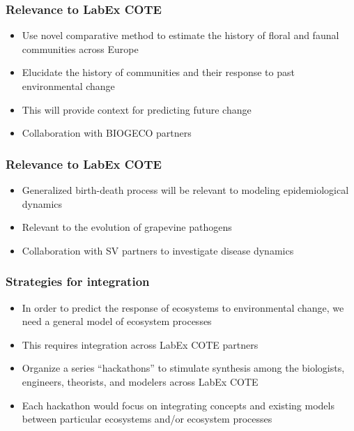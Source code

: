 \begin{frame}
    \frametitle{Relevance to LabEx COTE}
    \begin{itemize}
        \item<2-> Use novel comparative method to estimate the history of floral
            and faunal communities across Europe
        \item<3-> Elucidate the history of communities and their response to past
            environmental change
        \item<4-> This will provide context for predicting future change
        \item<5-> Collaboration with BIOGECO partners
    \end{itemize}
\end{frame}

\begin{frame}
    \frametitle{Relevance to LabEx COTE}
    \begin{itemize}[<+->]
        \item Generalized birth-death process will be relevant to
            modeling epidemiological dynamics
        \item Relevant to the evolution of grapevine pathogens
        \item Collaboration with SV partners to investigate disease dynamics
    \end{itemize}
\end{frame}


\begin{frame}
    \frametitle{Strategies for integration}
    \begin{itemize}
        \item<2-> In order to predict the response of ecosystems to environmental
            change, we need a general model of ecosystem processes
        \item<3-> This requires integration across LabEx COTE partners
        \item<3-> Organize a series ``hackathons'' to stimulate synthesis among the
            biologists, engineers, theorists, and modelers across LabEx COTE
        \item<4-> Each hackathon would focus on integrating concepts and existing
            models between particular ecosystems and/or ecosystem processes
    \end{itemize}
\end{frame}

